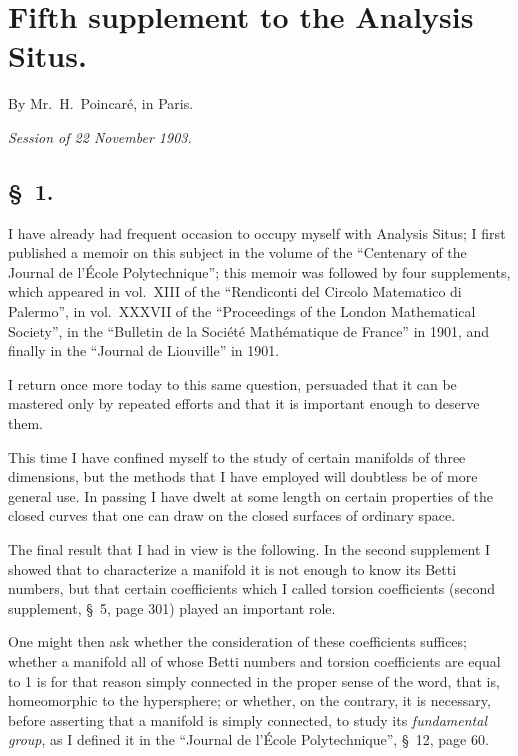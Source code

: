 \documentclass{article}
\begin{document}
\section*{Fifth supplement to the Analysis Situs.}

By Mr.~H.~Poincaré, in Paris.

\emph{Session of 22 November 1903.}

\subsection*{\S~1.}

I have already had frequent occasion to occupy myself with Analysis Situs; I first published a memoir on this subject in the volume of the ``Centenary of the Journal de l'École Polytechnique''; this memoir was followed by four supplements, which appeared in vol.~XIII of the ``Rendiconti del Circolo Matematico di Palermo'', in vol.~XXXVII of the ``Proceedings of the London Mathematical Society'', in the ``Bulletin de la Société Mathématique de France'' in 1901, and finally in the ``Journal de Liouville'' in 1901.

I return once more today to this same question, persuaded that it can be mastered only by repeated efforts and that it is important enough to deserve them.

This time I have confined myself to the study of certain manifolds of three dimensions, but the methods that I have employed will doubtless be of more general use. In passing I have dwelt at some length on certain properties of the closed curves that one can draw on the closed surfaces of ordinary space.

The final result that I had in view is the following. In the second supplement I showed that to characterize a manifold it is not enough to know its Betti numbers, but that certain coefficients which I called torsion coefficients (second supplement, \S~5, page 301) played an important role.


One might then ask whether the consideration of these coefficients suffices; whether a manifold all of whose Betti numbers and torsion coefficients are equal to 1 is for that reason simply connected in the proper sense of the word, that is, homeomorphic to the hypersphere; or whether, on the contrary, it is necessary, before asserting that a manifold is simply connected, to study its \emph{fundamental group}, as I defined it in the ``Journal de l'École Polytechnique'', \S~12, page 60.
\end{document}
